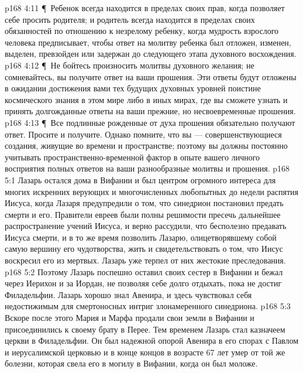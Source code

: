 \vs p168 4:11 \P\ \bibnobreakspace Ребенок всегда находится в пределах своих прав, когда позволяет себе просить родителя; и родитель всегда находится в пределах своих обязанностей по отношению к незрелому ребенку, когда мудрость взрослого человека предписывает, чтобы ответ на молитву ребенка был отложен, изменен, выделен, превзойден или задержан до следующего этапа духовного восхождения.
\vs p168 4:12 \P\ \bibnobreakspace Не бойтесь произносить молитвы духовного желания; не сомневайтесь, вы получите ответ на ваши прошения. Эти ответы будут отложены в ожидании достижения вами тех будущих духовных уровней поистине космического знания в этом мире либо в иных мирах, где вы сможете узнать и принять долгожданные ответы на ваши прежние, но несвоевременные прошения.
\vs p168 4:13 \P\ \bibnobreakspace Все подлинные рожденные от духа прошения обязательно получают ответ. Просите и получите. Однако помните, что вы --- совершенствующиеся создания, живущие во времени и пространстве; поэтому вы должны постоянно учитывать пространственно\hyp{}временной фактор в опыте вашего личного восприятия полных ответов на ваши разнообразные молитвы и прошения.
\vs p168 5:1 Лазарь остался дома в Вифании и был центром огромного интереса для многих искренних верующих и многочисленных любопытных до недели распятия Иисуса, когда Лазаря предупредили о том, что синедрион постановил предать смерти и его. Правители евреев были полны решимости пресечь дальнейшее распространение учений Иисуса, и верно рассудили, что бесполезно предавать Иисуса смерти, и в то же время позволить Лазарю, олицетворявшему собой самую вершину его чудотворства, жить и свидетельствовать о том, что Иисус воскресил его из мертвых. Лазарь уже терпел от них жестокие преследования.
\vs p168 5:2 Поэтому Лазарь поспешно оставил своих сестер в Вифании и бежал через Иерихон и за Иордан, не позволяя себе долго отдыхать, пока не достиг Филадельфии. Лазарь хорошо знал Авенира, и здесь чувствовал себя недостижимым для смертоносных интриг злонамеренного синедриона.
\vs p168 5:3 Вскоре после этого Мария и Марфа продали свои земли в Вифании и присоединились к своему брату в Перее. Тем временем Лазарь стал казначеем церкви в Филадельфии. Он был надежной опорой Авенира в его спорах с Павлом и иерусалимской церковью и в конце концов в возрасте 67 лет умер от той же болезни, которая свела его в могилу в Вифании, когда он был моложе.

